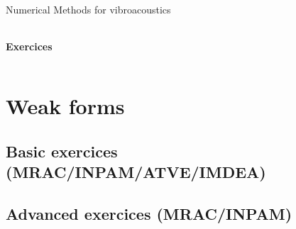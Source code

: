 \documentclass[10pt,a4paper]{report}
\begin{document}
\begin{center}
{\Large Numerical Methods for vibroacoustics }
 \begin{tabularx}{\linewidth}{c}
\hline
\end{tabularx}
\end{center}
\begin{center}
 {\Large \textbf{Exercices}\\}
\end{center}
 \begin{tabularx}{\linewidth}{c}
\hline
\end{tabularx}
\setcounter{chapter}{1}



\section{Weak forms}
\subsection{Basic exercices (MRAC/INPAM/ATVE/IMDEA)}







\subsection{Advanced exercices (MRAC/INPAM)}
\end{document}

